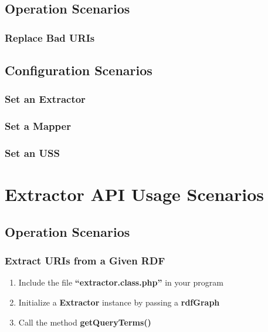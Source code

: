 \documentclass[letterpaper,10pt,english]{sphinxmanual}
\begin{document}
\subsection{Operation Scenarios}
\label{docs/scenarios/x2r:operation-scenarios}

\subsubsection{Replace Bad URIs}
\label{docs/scenarios/x2r:replace-bad-uris}

\subsection{Configuration Scenarios}
\label{docs/scenarios/x2r:configuration-scenarios}

\subsubsection{Set an Extractor}
\label{docs/scenarios/x2r:set-an-extractor}

\subsubsection{Set a Mapper}
\label{docs/scenarios/x2r:set-a-mapper}

\subsubsection{Set an USS}
\label{docs/scenarios/x2r:set-an-uss}

\section{Extractor API Usage Scenarios}
\label{docs/scenarios/extractor:extractor-api-usage-scenarios}\label{docs/scenarios/extractor::doc}

\subsection{Operation Scenarios}
\label{docs/scenarios/extractor:operation-scenarios}

\subsubsection{Extract URIs from a Given RDF}
\label{docs/scenarios/extractor:extract-uris-from-a-given-rdf}\begin{enumerate}
\item {} 
Include the file \textbf{``extractor.class.php''} in your program

\item {} 
Initialize a \textbf{Extractor} instance by passing a \textbf{rdfGraph}

\item {} 
Call the method \textbf{getQueryTerms()}

\end{enumerate}
\end{document}
